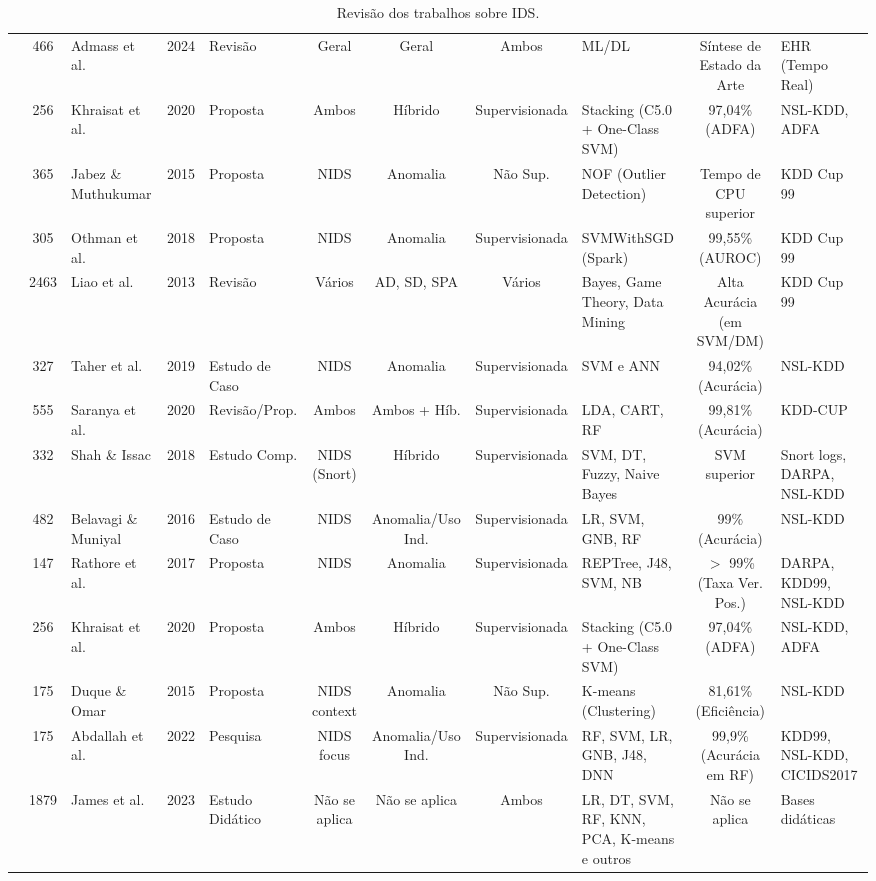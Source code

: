 \begin{table}[htbp]
\begin{adjustbox}{width=\textwidth}
\begin{tabular}{p{4cm} c p{3cm} c p{3cm} c c c p{4cm} c p{4cm}}
\cite{wasyhun2023cyber} & 466 & Admass et al. & 2024 & Revisão & Geral & Geral & Ambos & ML/DL & Síntese de Estado da Arte & EHR (Tempo Real) \\
\cite{Khraisat2019Hybrid} & 256 & Khraisat et al. & 2020 & Proposta & Ambos & Híbrido & Supervisionada & Stacking (C5.0 + One-Class SVM) & 97,04\% (ADFA) & NSL-KDD, ADFA \\
\cite{Jabez2015Intrusion} & 365 & Jabez \& Muthukumar & 2015 & Proposta & NIDS & Anomalia & Não Sup. & NOF (Outlier Detection) & Tempo de CPU superior & KDD Cup 99 \\
\cite{Othman2018Intrusion} & 305 & Othman et al. & 2018 & Proposta & NIDS & Anomalia & Supervisionada & SVMWithSGD (Spark) & 99,55\% (AUROC) & KDD Cup 99 \\
\cite{Liao2013Intrusion} & 2463 & Liao et al. & 2013 & Revisão & Vários & AD, SD, SPA & Vários & Bayes, Game Theory, Data Mining & Alta Acurácia (em SVM/DM) & KDD Cup 99 \\
\cite{Kazi2019network} & 327 & Taher et al. & 2019 & Estudo de Caso & NIDS & Anomalia & Supervisionada & SVM e ANN & 94,02\% (Acurácia) & NSL-KDD \\
\cite{Saranya2020Performance} & 555 & Saranya et al. & 2020 & Revisão/Prop. & Ambos & Ambos + Híb. & Supervisionada & LDA, CART, RF & 99,81\% (Acurácia) & KDD-CUP \\
\cite{Shah2018Performance} & 332 & Shah \& Issac & 2018 & Estudo Comp. & NIDS (Snort) & Híbrido & Supervisionada & SVM, DT, Fuzzy, Naive Bayes & SVM superior & Snort logs, DARPA, NSL-KDD \\
\cite{Belavagi2016Performance} & 482 & Belavagi \& Muniyal & 2016 & Estudo de Caso & NIDS & Anomalia/Uso Ind. & Supervisionada & LR, SVM, GNB, RF & 99\% (Acurácia) & NSL-KDD \\
\cite{Rathore2016RealTime} & 147 & Rathore et al. & 2017 & Proposta & NIDS & Anomalia & Supervisionada & REPTree, J48, SVM, NB & $>$ 99\% (Taxa Ver. Pos.) & DARPA, KDD99, NSL-KDD \\
\cite{Khraisat2019Survey} & 256 & Khraisat et al. & 2020 & Proposta & Ambos & Híbrido & Supervisionada & Stacking (C5.0 + One-Class SVM) & 97,04\% (ADFA) & NSL-KDD, ADFA \\
\cite{solane2015using} & 175 & Duque \& Omar & 2015 & Proposta & NIDS context & Anomalia & Não Sup. & K-means (Clustering) & 81,61\% (Eficiência) & NSL-KDD \\
\cite{emad2022intrusion} & 175 & Abdallah et al. & 2022 & Pesquisa & NIDS focus & Anomalia/Uso Ind. & Supervisionada & RF, SVM, LR, GNB, J48, DNN & 99,9\% (Acurácia em RF) & KDD99, NSL-KDD, CICIDS2017 \\
\cite{James2023Introduction} & 1879 & James et al. & 2023 & Estudo Didático & Não se aplica & Não se aplica & Ambos & LR, DT, SVM, RF, KNN, PCA, K-means e outros & Não se aplica & Bases didáticas \\
\bottomrule
\end{tabular}
\end{adjustbox}
\caption{Revisão dos trabalhos sobre IDS.}
\label{tab:revisao}
\end{table}

